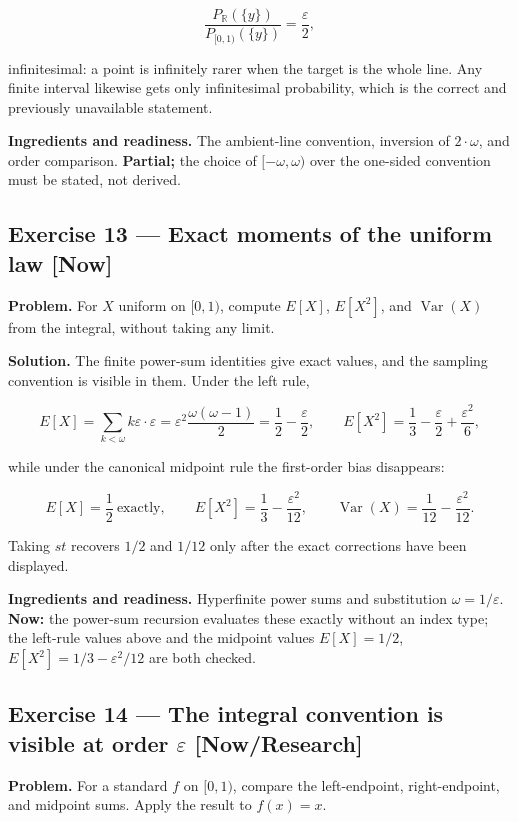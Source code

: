 \documentclass[11pt]{article}
\newcommand{\eps}{\varepsilon}
\renewcommand{\epsilon}{\varepsilon}
\newcommand{\Var}{\operatorname{Var}}
\begin{document}
\[
\frac{P_{\mathbb R}(\{y\})}{P_{[0,1)}(\{y\})}=\frac\epsilon2 ,
\]

infinitesimal: a point is infinitely rarer when the target is the whole line.
Any finite interval likewise gets only infinitesimal probability, which is the
correct and previously unavailable statement.

\textbf{Ingredients and readiness.} The ambient-line convention, inversion of
$2\cdot \omega$, and order comparison. \textbf{Partial;} the choice of $[-\omega, \omega)$
over the one-sided convention must be stated, not derived.


\subsection*{Exercise 13 --- Exact moments of the uniform law \hfill \normalfont\small[Now]}

\textbf{Problem.} For $X$ uniform on $[0,1)$, compute $E[X]$, $E[X^2]$, and
$\Var(X)$ from the integral, without taking any limit.

\textbf{Solution.} The finite power-sum identities give exact values, and the
sampling convention is visible in them. Under the left rule,

\[
E[X]=\sum_{k<\omega}k\epsilon\cdot\epsilon
=\epsilon^{2}\frac{\omega(\omega-1)}2=\frac12-\frac\epsilon2,
\qquad
E[X^{2}]=\frac13-\frac\epsilon2+\frac{\epsilon^{2}}6 ,
\]

while under the canonical midpoint rule the first-order bias disappears:

\[
E[X]=\frac12 \ \text{exactly},
\qquad
E[X^{2}]=\frac13-\frac{\epsilon^{2}}{12},
\qquad
\operatorname{Var}(X)=\frac1{12}-\frac{\epsilon^{2}}{12}.
\]

Taking $st$ recovers $1/2$ and $1/12$ only after the exact corrections have
been displayed.

\textbf{Ingredients and readiness.} Hyperfinite power sums and substitution
$\omega = 1/\eps$. \textbf{Now:} the power-sum recursion evaluates these exactly
without an index type; the left-rule values above and the midpoint values
$E[X] = 1/2$, $E[X^2] = 1/3 - \eps^2/12$ are both checked.


\subsection*{Exercise 14 --- The integral convention is visible at order $\eps$ \hfill \normalfont\small[Now/Research]}

\textbf{Problem.} For a standard $f$ on $[0,1)$, compare the left-endpoint,
right-endpoint, and midpoint sums. Apply the result to $f(x) = x$.
\end{document}
